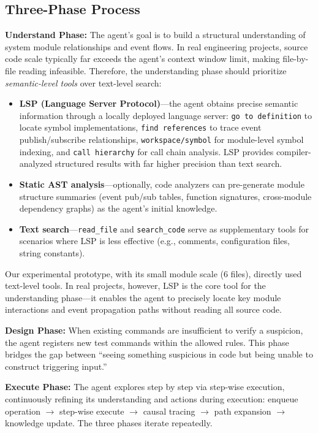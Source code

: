 \documentclass[sigconf,nonacm]{acmart}
\begin{document}
\subsection{Three-Phase Process}

\textbf{Understand Phase:} The agent's goal is to build a structural understanding of system module relationships and event flows. In real engineering projects, source code scale typically far exceeds the agent's context window limit, making file-by-file reading infeasible. Therefore, the understanding phase should prioritize \emph{semantic-level tools} over text-level search:

\begin{itemize}
\item \textbf{LSP (Language Server Protocol)}---the agent obtains precise semantic information through a locally deployed language server: \texttt{go to definition} to locate symbol implementations, \texttt{find references} to trace event publish/subscribe relationships, \texttt{workspace/symbol} for module-level symbol indexing, and \texttt{call hierarchy} for call chain analysis. LSP provides compiler-analyzed structured results with far higher precision than text search.
\item \textbf{Static AST analysis}---optionally, code analyzers can pre-generate module structure summaries (event pub/sub tables, function signatures, cross-module dependency graphs) as the agent's initial knowledge.
\item \textbf{Text search}---\texttt{read\_file} and \texttt{search\_code} serve as supplementary tools for scenarios where LSP is less effective (e.g., comments, configuration files, string constants).
\end{itemize}

Our experimental prototype, with its small module scale (6 files), directly used text-level tools. In real projects, however, LSP is the core tool for the understanding phase---it enables the agent to precisely locate key module interactions and event propagation paths without reading all source code.

\textbf{Design Phase:} When existing commands are insufficient to verify a suspicion, the agent registers new test commands within the allowed rules. This phase bridges the gap between ``seeing something suspicious in code but being unable to construct triggering input.''

\textbf{Execute Phase:} The agent explores step by step via step-wise execution, continuously refining its understanding and actions during execution: enqueue operation $\to$ step-wise execute $\to$ causal tracing $\to$ path expansion $\to$ knowledge update. The three phases iterate repeatedly.
\end{document}
